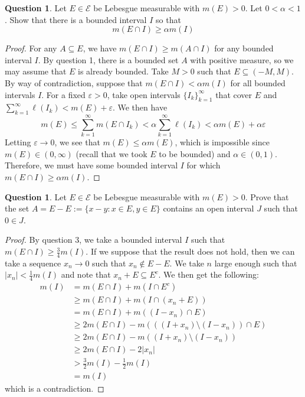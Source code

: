 \documentclass{article}
\theoremstyle{definition} %
\numberwithin{thm}{section} %
\theoremstyle{definition} %
\newtheorem{question}[thm]{Question}
\begin{document}
\begin{question}
Let $E \in \mathcal{E}$ be Lebesgue measurable with $m(E) > 0$. Let $0 < \alpha < 1$. Show that there is a bounded interval $I$ so that
\[ m(E \cap I) \geq \alpha m(I) \]
\end{question}
\begin{proof}
For any $A \subseteq E$, we have $m(E \cap I) \geq m(A \cap I)$ for any bounded interval $I$. By question 1, there is a bounded set $A$ with positive measure, so we may assume that $E$ is already bounded. Take $M > 0$ such that $E \subseteq (-M, M)$. By way of contradiction, suppose that $m(E \cap I) < \alpha m(I)$ for all bounded intervals $I$. For a fixed $\varepsilon > 0$, take open intervals ${\{I_k\}}_{k = 1}^\infty$ that cover $E$ and $\sum_{k = 1}^\infty \ell(I_k) < m(E) + \varepsilon$. We then have 
\[ m(E) \leq \sum_{k = 1}^\infty m(E \cap I_k) < \alpha \sum_{k = 1}^\infty \ell(I_k) < \alpha m(E) + \alpha\varepsilon \]
Letting $\varepsilon \to 0$, we see that $m(E) \leq \alpha m(E)$, which is impossible since $m(E) \in (0, \infty)$ (recall that we took $E$ to be bounded) and $\alpha \in (0, 1)$. Therefore, we must have some bounded interval $I$ for which $m(E \cap I) \geq \alpha m(I)$.
\end{proof}
    
\begin{question}
Let $E \in \mathcal{E}$ be Lebesgue measurable with $m(E) > 0$. Prove that the set $A = E - E := \{x - y : x \in E, y \in E\}$ contains an open interval $J$ such that $0 \in J$.
\end{question}
\begin{proof}
By question 3, we take a bounded interval $I$ such that $m(E \cap I) \geq \frac{3}{4}m(I)$. If we suppose that the result does not hold, then we can take a sequence $x_n \to 0$ such that $x_n \notin E - E$. We take $n$ large enough such that $|x_n| < \frac{1}{4}m(I)$ and note that $x_n + E \subseteq E^c$. We then get the following:
\begin{align*}
    m(I)
    &= m(E \cap I) + m(I \cap E^c) \\
    &\geq m(E \cap I) + m(I \cap (x_n + E)) \\
    &= m(E \cap I) + m((I - x_n) \cap E) \\
    &\geq 2m(E \cap I) - m(((I + x_n) \setminus (I - x_n)) \cap E) \\
    &\geq 2m(E \cap I) - m((I + x_n) \setminus (I - x_n)) \\
    &\geq 2m(E \cap I) - 2|x_n| \\
    &> \frac{3}{2}m(I) - \frac{1}{2}m(I) \\
    &= m(I)
\end{align*}
which is a contradiction.
\end{proof}
\end{document}
